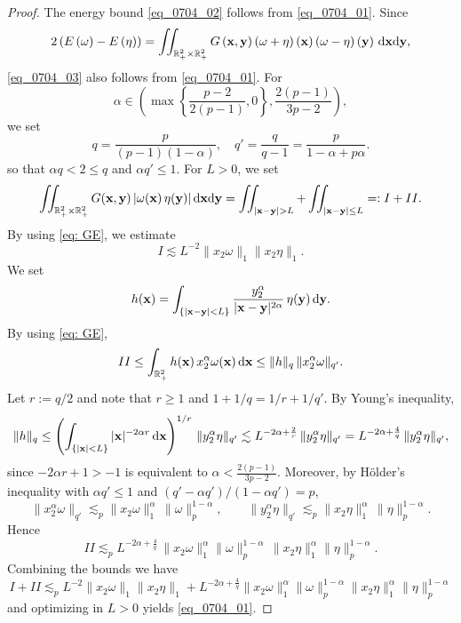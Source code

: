 \documentclass[11pt]{amsart}
\theoremstyle{definition}
\theoremstyle{definition}
\numberwithin{equation}{section}
\newcommand{\0}{\emptyset}
\newcommand{\bfx}{{\bf x}}
\newcommand{\bfy}{{\bf y}}
\newcommand{\bbR}{\mathbb R}
\newcommand{\dd}{\mathrm{d}}
\begin{document}
	\begin{proof}
		The energy bound \eqref{eq_0704_02} follows from \eqref{eq_0704_01}. Since 
		\[
		2\left( E \left( \omega \right)-E\left( \eta \right) \right)
		=\iint_{\bbR^2_+\times\bbR^2_+} G\left( \bfx,\bfy \right)\left(\omega+\eta\right)\left( \bfx \right) \left(\omega-\eta \right)\left(\bfy \right)\,\dd\bfx\dd\bfy,
		\]
		\eqref{eq_0704_03} also follows from \eqref{eq_0704_01}. For 
		\[
		\alpha \in \left( \max \left\{ \frac{p-2}{2(p-1)}, 0 \right\} , \frac{2(p-1)}{3p-2} \right),
		\]
		we set 
		\[
		q = \frac{p}{(p-1)(1-\alpha)}, \quad q'= \frac{q}{q-1}= \frac{p}{1-\alpha+p\alpha}.
		\]
		so that $\alpha q < 2 \le q$ and $\alpha q'\le 1$. For $L>0$, we set 
		\[
		\iint_{\bbR^2_+\times\bbR^2_+} G(\bfx,\bfy)\,|\omega(\bfx)\,\eta(\bfy)|\,\dd\bfx\dd\bfy
		= \iint_{|\bfx-\bfy|>L} + \iint_{|\bfx-\bfy|\le L} =: I+II.
		\]
		By using \eqref{eq: GE}, we estimate 
		\[
		I \lesssim L^{-2}\|x_2\omega\|_{1}\|x_2\eta\|_{1}.
		\]
		We set
		\[
		h(\bfx)=\int_{\{|\bfx-\bfy|<L\}}\frac{y_2^\alpha}{|\bfx-\bfy|^{2\alpha}}\,\eta(\bfy)\,\dd\bfy.
		\]
		By using \eqref{eq: GE}, 
		\[
		II\le \int_{\bbR^2_+} h(\bfx)\,x_2^\alpha \omega(\bfx)\,\dd\bfx
		\le \|h\|_{q}\,\|x_2^\alpha\omega\|_{q'}.
		\]
		Let $r:=q/2$ and note that $r\ge1$ and $1+1/q=1/r+1/q'$.
		By Young's inequality,
		\[
		\|h\|_{q}\le \left(\int_{\{|\bfx|<L\}}|\bfx|^{-2\alpha r}\,\dd\bfx\right)^{1/r}\,\|y_2^\alpha\eta\|_{q'}
		\lesssim L^{-2\alpha+\frac{2}{r}}\,\|y_2^\alpha\eta\|_{q'}
		= L^{-2\alpha+\frac{4}{q}}\,\|y_2^\alpha\eta\|_{q'},
		\]
		since $-2\alpha r + 1  > -1$ is equivalent to $\alpha < \frac{2(p-1)}{3p-2}$.
		Moreover, by H\"older's inequality with $\alpha q'\le1$ and $(q'-\alpha q')/(1-\alpha q')=p$,
		\[
		\|x_2^\alpha\omega\|_{q'} \lesssim_p \|x_2\omega\|_{1}^\alpha\,\|\omega\|_{p}^{1-\alpha},
		\qquad
		\|y_2^\alpha\eta\|_{q'} \lesssim_p \|x_2\eta\|_{1}^\alpha\,\|\eta\|_{p}^{1-\alpha}.
		\]
		Hence
		\[
		II \lesssim_p L^{-2\alpha+\frac{4}{q}}\,
		\|x_2\omega\|_{1}^\alpha\|\omega\|_{p}^{1-\alpha}\,
		\|x_2\eta\|_{1}^\alpha\|\eta\|_{p}^{1-\alpha}.
		\]
		Combining the bounds we have
		\[
		I + II \lesssim_p 
		L^{-2}\|x_2\omega\|_{1}\|x_2\eta\|_{1}
		+L^{-2\alpha+\frac{4}{q}}
		\|x_2\omega\|_{1}^{\alpha}\|\omega\|_{p}^{1-\alpha}
		\|x_2\eta\|_{1}^{\alpha}\|\eta\|_{p}^{1-\alpha}
		\]
		and optimizing in $L>0$ yields \eqref{eq_0704_01}. 
	\end{proof}
\end{document}
